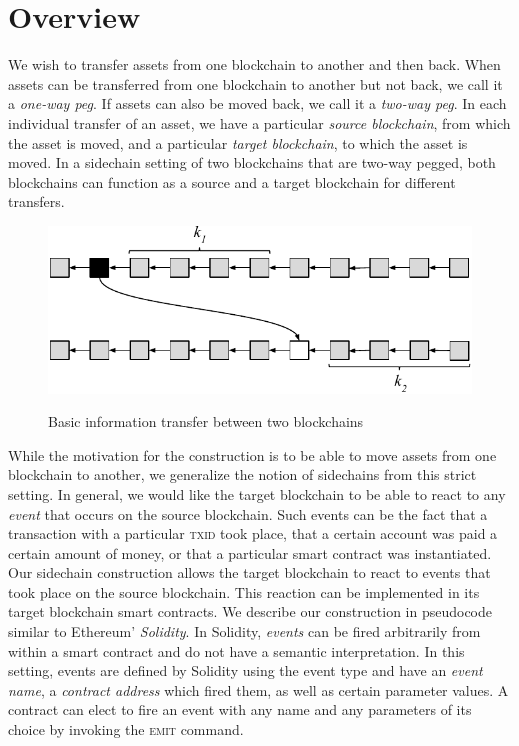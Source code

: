 \section{Overview}
We wish to transfer assets from one blockchain to another and then back. When
assets can be transferred from one blockchain to another but not back, we call
it a \emph{one-way peg}. If assets can also be moved back, we call it a
\emph{two-way peg}. In each individual transfer of an asset, we have a
particular \emph{source blockchain}, from which the asset is moved, and a
particular \emph{target blockchain}, to which the asset is moved. In a sidechain
setting of two blockchains that are two-way pegged, both blockchains can
function as a source and a target blockchain for different transfers.

\begin{figure}
    \vspace{-2em}
    \caption{Basic information transfer between two blockchains}
    \centering
    \includegraphics[width=0.7 \columnwidth,keepaspectratio]{figures/events.pdf}
    \label{fig.events}
    \vspace{-2em}
\end{figure}

While the motivation for the construction is to be able to move assets from one
blockchain to another, we generalize the notion of sidechains from this strict
setting. In general, we would like the target blockchain to be able to react to
any \emph{event} that occurs on the source blockchain. Such events can be the
fact that a transaction with a particular \textsc{txid} took place, that a
certain account was paid a certain amount of money, or that a particular smart
contract was instantiated. Our sidechain construction allows the target
blockchain to react to events that took place on the source blockchain. This
reaction can be implemented in its target blockchain smart contracts. We
describe our construction in pseudocode similar to Ethereum' \emph{Solidity}. In
Solidity, \emph{events} can be fired arbitrarily from within a smart contract
and do not have a semantic interpretation. In this setting, events are defined
by Solidity using the \textsf{event} type and have an \emph{event name}, a
\emph{contract address} which fired them, as well as certain parameter values. A
contract can elect to fire an event with any name and any parameters of its
choice by invoking the \textsc{emit} command.

